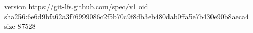 version https://git-lfs.github.com/spec/v1
oid sha256:6e6d9bfa62a3f76999086c2f5b70c9f8db3eb480dab0ffa5e7b430e90b8aeca4
size 87528
